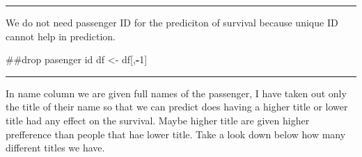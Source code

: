 \documentclass[]{article}
\newenvironment{Shaded}{\begin{snugshade}}{\end{snugshade}}
\newcommand{\KeywordTok}[1]{\textcolor[rgb]{0.13,0.29,0.53}{\textbf{#1}}}
\newcommand{\DataTypeTok}[1]{\textcolor[rgb]{0.13,0.29,0.53}{#1}}
\newcommand{\DecValTok}[1]{\textcolor[rgb]{0.00,0.00,0.81}{#1}}
\newcommand{\StringTok}[1]{\textcolor[rgb]{0.31,0.60,0.02}{#1}}
\newcommand{\ControlFlowTok}[1]{\textcolor[rgb]{0.13,0.29,0.53}{\textbf{#1}}}
\newcommand{\OperatorTok}[1]{\textcolor[rgb]{0.81,0.36,0.00}{\textbf{#1}}}
\newcommand{\NormalTok}[1]{#1}
\begin{document}
\begin{center}\rule{0.5\linewidth}{\linethickness}\end{center}

We do not need passenger ID for the prediciton of survival because
unique ID cannot help in prediction.

\begin{Shaded}
\begin{Highlighting}[]
\NormalTok{##drop pasenger id}
\NormalTok{df <-}\StringTok{ }\NormalTok{df[,}\OperatorTok{-}\DecValTok{1}\NormalTok{]}
\end{Highlighting}
\end{Shaded}

\begin{center}\rule{0.5\linewidth}{\linethickness}\end{center}

In name column we are given full names of the passenger, I have taken
out only the title of their name so that we can predict does having a
higher title or lower title had any effect on the survival. Maybe higher
title are given higher prefference than people that hae lower title.
Take a look down below how many different titles we have.

\begin{Shaded}
\end{Shaded}
\end{document}
